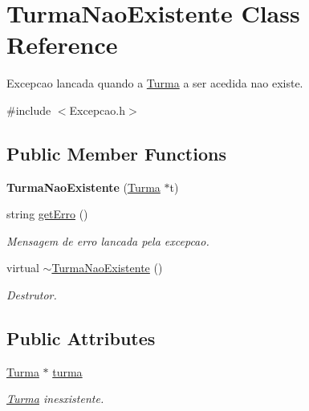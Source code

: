 \hypertarget{class_turma_nao_existente}{\section{Turma\-Nao\-Existente Class Reference}
\label{class_turma_nao_existente}
}


Excepcao lancada quando a \hyperlink{class_turma}{Turma} a ser acedida nao existe.  




{\ttfamily \#include $<$Excepcao.\-h$>$}

\subsection*{Public Member Functions}
\begin{DoxyCompactItemize}
\item 
\hypertarget{class_turma_nao_existente_a9c2b3b2ad6de696dd3432951b278c975}{{\bfseries Turma\-Nao\-Existente} (\hyperlink{class_turma}{Turma} $\ast$t)}\label{class_turma_nao_existente_a9c2b3b2ad6de696dd3432951b278c975}

\item 
string \hyperlink{class_turma_nao_existente_a5672fe80509c285ce4468137c3574351}{get\-Erro} ()
\begin{DoxyCompactList}\small\item\em Mensagem de erro lancada pela excepcao. \end{DoxyCompactList}\item 
\hypertarget{class_turma_nao_existente_a89025d5c39ff6a1590e2e7bb010fa3b7}{virtual \hyperlink{class_turma_nao_existente_a89025d5c39ff6a1590e2e7bb010fa3b7}{$\sim$\-Turma\-Nao\-Existente} ()}\label{class_turma_nao_existente_a89025d5c39ff6a1590e2e7bb010fa3b7}

\begin{DoxyCompactList}\small\item\em Destrutor. \end{DoxyCompactList}\end{DoxyCompactItemize}
\subsection*{Public Attributes}
\begin{DoxyCompactItemize}
\item 
\hypertarget{class_turma_nao_existente_ab14dc459c3d9bd70bea8e583b2ce072e}{\hyperlink{class_turma}{Turma} $\ast$ \hyperlink{class_turma_nao_existente_ab14dc459c3d9bd70bea8e583b2ce072e}{turma}}\label{class_turma_nao_existente_ab14dc459c3d9bd70bea8e583b2ce072e}

\begin{DoxyCompactList}\small\item\em \hyperlink{class_turma}{Turma} inesxistente. \end{DoxyCompactList}\end{DoxyCompactItemize}


